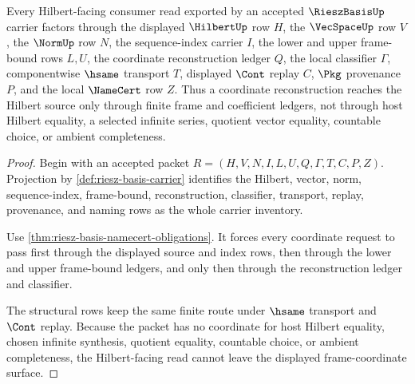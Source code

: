 \begin{theorem}
\label{thm:riesz-basis-frame-coordinate-handoff}
Every Hilbert-facing consumer read exported by an accepted $\RieszBasisUp$ carrier factors through the displayed $\HilbertUp$ row $H$, the $\VecSpaceUp$ row $V$, the $\NormUp$ row $N$, the sequence-index carrier $I$, the lower and upper frame-bound rows $L,U$, the coordinate reconstruction ledger $Q$, the local classifier $\Gamma$, componentwise $\hsame$ transport $T$, displayed $\Cont$ replay $C$, $\Pkg$ provenance $P$, and the local $\NameCert$ row $Z$. Thus a coordinate reconstruction reaches the Hilbert source only through finite frame and coefficient ledgers, not through host Hilbert equality, a selected infinite series, quotient vector equality, countable choice, or ambient completeness.
\end{theorem}
\begin{proof}
Begin with an accepted packet $R=(H,V,N,I,L,U,Q,\Gamma,T,C,P,Z)$. Projection by \autoref{def:riesz-basis-carrier} identifies the Hilbert, vector, norm, sequence-index, frame-bound, reconstruction, classifier, transport, replay, provenance, and naming rows as the whole carrier inventory.

Use \autoref{thm:riesz-basis-namecert-obligations}. It forces every coordinate request to pass first through the displayed source and index rows, then through the lower and upper frame-bound ledgers, and only then through the reconstruction ledger and classifier.

The structural rows keep the same finite route under $\hsame$ transport and $\Cont$ replay. Because the packet has no coordinate for host Hilbert equality, chosen infinite synthesis, quotient equality, countable choice, or ambient completeness, the Hilbert-facing read cannot leave the displayed frame-coordinate surface.
\end{proof}


